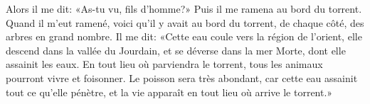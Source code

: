 Alors il me dit:
	«As-tu vu, fils d’homme?»
	Puis il me ramena au bord du torrent.
Quand il m’eut ramené,
	voici qu’il y avait au bord du torrent, de chaque côté, des arbres en grand nombre.
Il me dit: «Cette eau coule vers la région de l’orient,
	elle descend dans la vallée du Jourdain,
	et se déverse dans la mer Morte, dont elle assainit les eaux.
En tout lieu où parviendra le torrent, tous les animaux pourront vivre et foisonner.
Le poisson sera très abondant, car cette eau assainit tout ce qu’elle pénètre,
	et la vie apparaît en tout lieu où arrive le torrent.»
